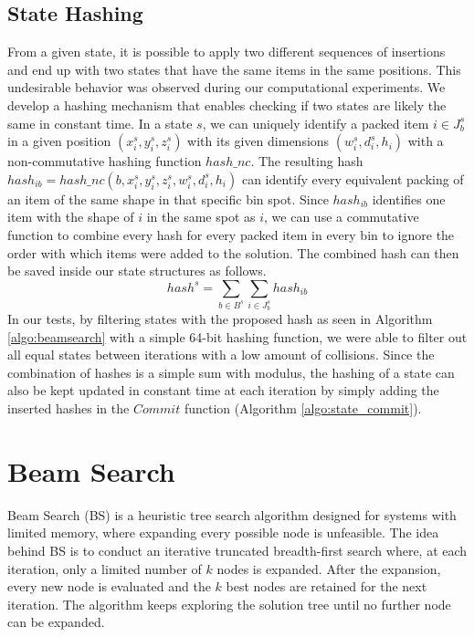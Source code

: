 \subsection{State Hashing}
\label{sec:state_uniqueness}%
From a given state, it is possible to apply two different sequences of insertions and end up with two states that have the same items in the same positions.
This undesirable behavior was observed during our computational experiments.
We develop a hashing mechanism that enables checking if two states are likely the same in constant time.
In a state $s$, we can uniquely identify a packed item $i \in J^s_b$ in a given position $(x^s_i, y^s_i, z^s_i)$ with its given dimensions $(w^s_i, d^s_i, h_i)$ with a non-commutative hashing function $hash\_nc$. The resulting hash $hash_{ib} = hash\_nc(b, x^s_i, y^s_i, z^s_i, w^s_i, d^s_i, h_i)$ can identify every equivalent packing of an item of the same shape in that specific bin spot.
Since $hash_{ib}$ identifies one item with the shape of $i$ in the same spot as $i$, we can use a commutative function to combine every hash for every packed item in every bin to ignore the order with which items were added to the solution.
The combined hash can then be saved inside our state structures as follows.
\begin{equation}
    hash^s = \sum\limits_{b \in B^s}{\sum\limits_{i \in J^s_b}{hash_{ib}}}
\end{equation}
In our tests, by filtering states with the proposed hash as seen in Algorithm \ref{algo:beamsearch} with a simple 64-bit hashing function, we were able to filter out all equal states between iterations with a low amount of collisions.
Since the combination of hashes is a simple sum with modulus, the hashing of a state can also be kept updated in constant time at each iteration by simply adding the inserted hashes in the $Commit$ function (Algorithm \ref{algo:state_commit}).

\section{Beam Search}
\label{sec:beamsearch}%
Beam Search (BS) is a heuristic tree search algorithm designed for systems with limited memory, where expanding every possible node is unfeasible.
The idea behind BS is to conduct an iterative truncated breadth-first search where, at each iteration, only a limited number of $k$ nodes is expanded.
After the expansion, every new node is evaluated and the $k$ best nodes are retained for the next iteration. The algorithm keeps exploring the solution tree until no further node can be expanded.

